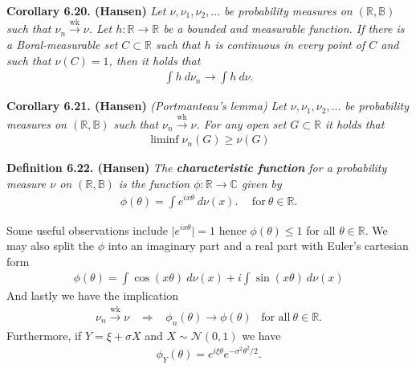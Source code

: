 \documentclass[a4paper,12pt,openany]{book}
\begin{document}
\textbf{Corollary 6.20. (Hansen)} \emph{Let \(\nu,\nu_1,\nu_2,...\) be probability measures on \((\mathbb{R},\mathbb{B})\) such that \(\nu_n\stackrel{\text{wk}}{\to}\nu\). Let \(h : \mathbb{R}\to\mathbb{R}\) be a bounded and measurable function. If there is a Boral-measurable set \(C\subset \mathbb{R}\) such that \(h\) is continuous in every point of \(C\) and such that \(\nu(C)=1\), then it holds that}
\begin{align*}
    \int h\ d\nu_n\to \int h\ d\nu.\tag{6.20}
\end{align*}

\textbf{Corollary 6.21. (Hansen)} \emph{(Portmanteau's lemma) Let \(\nu,\nu_1,\nu_2,...\) be probability measures on \((\mathbb{R},\mathbb{B})\) such that \(\nu_n\stackrel{\text{wk}}{\to}\nu\). For any open set \(G\subset \mathbb{R}\) it holds that}
\begin{align*}
    \liminf{\nu_n(G)}\ge \nu(G)\tag{6.21}
\end{align*}

\textbf{Definition 6.22. (Hansen)} \emph{The \textbf{characteristic function} for a probability measure \(\nu\) on \((\mathbb{R},\mathbb{B})\) is the function \(\phi : \mathbb{R}\to \mathbb{C}\) given by}
\begin{align*}
    \phi(\theta)=\int e^{ix\theta}\ d\nu(x).\hspace{15pt}\text{for}\ \theta\in\mathbb{R}.\tag{6.23}
\end{align*}

Some useful observations include \(\vert e^{ix\theta}\vert = 1\) hence \(\phi(\theta)\le 1\) for all \(\theta\in\mathbb{R}\). We may also split the \(\phi\) into an imaginary part and a real part with Euler's cartesian form
\begin{align*}
    \phi(\theta)=\int \cos (x\theta)\ d\nu(x)+i\int \sin (x\theta)\ d\nu(x)\tag{6.24}
\end{align*}
And lastly we have the implication
\begin{align*}
    \nu_n\stackrel{\text{wk}}{\to} \nu \hspace{10pt}\Rightarrow\hspace{10pt} \phi_n(\theta)\to \phi(\theta)\hspace{10pt}\text{for all}\ \theta\in\mathbb{R}.
\end{align*}
Furthermore, if \(Y=\xi+\sigma X\) and \(X\sim \mathcal{N}(0,1)\) we have
\begin{align*}
    \phi_Y(\theta)=e^{i\xi\theta}e^{-\sigma^2\theta^2/2}.
\end{align*}
\end{document}
